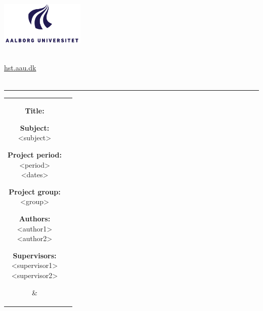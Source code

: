 	\begin{adjustwidth*}{-1.6cm}{-1cm}
		\begin{nopagebreak}
			{\samepage{}
				\parbox{14.5cm}{
					\begin{flushright}
						\includegraphics[width=0.3\textwidth]{img/aauLogoEn.png}\\
					\end{flushright}
					\vspace{0.2cm}
				  \\
				  { \href{http://hst.aau.dk/}{hst.aau.dk}}\\
				  \vspace{-0.8cm}\\
					\hrule
					\vspace{0.2cm}
				}
				
				\begin{tabular}{cc}
					\parbox{6.3cm}{
						\hspace{2cm}
						\begin{description}
							\item {\textbf{Title:}}\\
								\thetitle
							\item {\textbf{Subject:}}\\
								<subject>\\
							\item {\textbf{Project period:}}\\
							  <period>\\
							  <dates>\\
							\item {\textbf{Project group:}}\\
							  <group>
							\item {\textbf{Authors:}}\\
								<author1>\\
								<author2>\\
							\item {\textbf{Supervisors:}}\\
								<supervisor1>\\
								<supervisor2>\\
						\end{description}
						\vfill
					} &
					\parbox{6.5cm}{
					  \flushright{}
					}
				\end{tabular} \newline
				
}
\end{nopagebreak}
\end{adjustwidth*}
